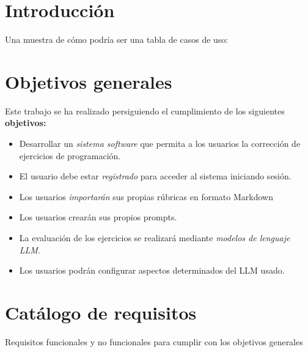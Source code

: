 
\section{Introducción}

Una muestra de cómo podría ser una tabla de casos de uso:

\section{Objetivos generales}

Este trabajo se ha realizado persiguiendo el cumplimiento de los siguientes \textbf{objetivos:}

\begin{itemize}
    \item Desarrollar un \textit{sistema software} que permita a los usuarios la corrección de ejercicios de programación.
    \item El usuario debe estar \textit{registrado} para acceder al sistema iniciando sesión.
    \item Los usuarios \textit{importarán} sus propias rúbricas en formato Markdown
    \item Los usuarios crearán sus propios prompts.
    \item La evaluación de los ejercicios se realizará mediante \textit{modelos de lenguaje LLM}.
    \item Los usuarios podrán configurar aspectos determinados del LLM usado.
    
\end{itemize}

\section{Catálogo de requisitos}
Requisitos funcionales y no funcionales para cumplir con los objetivos generales

